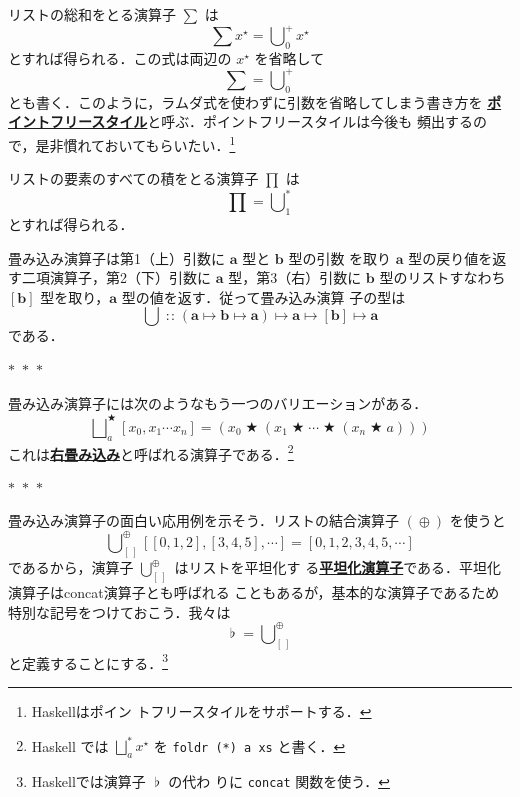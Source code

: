 \documentclass[a5paper,twoside,fleqn,draft]{jsbook}
\newcommand{\separator}{\begin{center}$*$~$*$~$*$\end{center}}
\newcommand{\programminglanguage}[1]{\textsf{#1}}
\newcommand{\haskell}{\programminglanguage{Haskell}}
\newcommand{\keyword}[1]{{\underline{\textbf{#1}}}}
\newcommand{\code}[1]{\texttt{#1}}
\newcommand{\mEmptyList}{{[\,]}}
\DeclareMathOperator{\mAppend}{\oplus}
\DeclareMathOperator{\mBinOp}{\bigstar}
\DeclareMathOperator{\mConcat}{\flat}
\DeclareMathOperator*{\mFold}{\bigcup}
\DeclareMathOperator*{\mFoldRight}{\bigsqcup}
\DeclareMathOperator{\mIn}{{:\!:}}
\DeclareMathOperator{\mMapsTo}{\mapsto}
\newcommand{\mType}[1]{\mathbf{#1}}
\newcommand{\mListType}[1]{[\mType{#1}]}
\newcommand{\mListWith}[1]{\left[#1\right]}
\newcommand{\mList}[1]{{#1}^\mathrm{\star}}
\newcommand{\mProj}[2]{#1\mMapsTo#2}
\begin{document}
リストの総和をとる演算子 $\sum$ は
\begin{equation}
\sum\mList{x}=\mFold^+_0\mList{x}
\end{equation}
とすれば得られる．この式は両辺の $\mList{x}$ を省略して
\begin{equation}
\sum=\mFold^+_0
\end{equation}
とも書く．このように，ラムダ式を使わずに引数を省略してしまう書き方を
\keyword{ポイントフリースタイル}と呼ぶ．ポイントフリースタイルは今後も
頻出するので，是非慣れておいてもらいたい．\footnote{\haskell はポイン
  トフリースタイルをサポートする．}

リストの要素のすべての積をとる演算子 $\prod$ は
\begin{equation}
\prod=\mFold^*_1
\end{equation}
とすれば得られる．

畳み込み演算子は第1（上）引数に $\mType{a}$ 型と $\mType{b}$ 型の引数
を取り $\mType{a}$ 型の戻り値を返す二項演算子，第2（下）引数に
$\mType{a}$ 型，第3（右）引数に $\mType{b}$ 型のリストすなわち
$\mListType{b}$ 型を取り，$\mType{a}$ 型の値を返す．従って畳み込み演算
子の型は
\begin{equation}
\mFold \mIn{} \mProj{
  (\mProj{\mType{a}}{\mProj{\mType{b}}{\mType{a}}}) } {
  \mProj{\mType{a}}{\mProj{\mListType{b}}{\mType{a}}} }
\end{equation}
である．

\separator

畳み込み演算子には次のようなもう一つのバリエーションがある．
\begin{equation}
\mFoldRight^{\mBinOp}_{a}\mListWith{x_0,x_1\dotsb x_n}
=(x_0\mBinOp(x_1\mBinOp\dotsb\mBinOp(x_n\mBinOp a)))
\end{equation}
これは\keyword{右畳み込み}と呼ばれる演算子である．\footnote{\haskell
  では $\mFoldRight^{*}_a\mList{x}$ を \code{foldr (*) a xs} と書く．}

\separator

畳み込み演算子の面白い応用例を示そう．リストの結合演算子 $(\mAppend)$
を使うと
\begin{equation}
  \mFold_\mEmptyList^{\mAppend}\mListWith{\mListWith{0,1,2},\mListWith{3,4,5},\dotsb}
  =\mListWith{0,1,2,3,4,5,\dotsb}
\end{equation}
であるから，演算子 $\mFold_\mEmptyList^{\mAppend}$ はリストを平坦化す
る\keyword{平坦化演算子}である．平坦化演算子はconcat演算子とも呼ばれる
こともあるが，基本的な演算子であるため特別な記号をつけておこう．我々は
\begin{equation}
\mConcat=\mFold_\mEmptyList^{\mAppend}
\end{equation}
と定義することにする．\footnote{\haskell では演算子 $\mConcat$ の代わ
  りに \code{concat} 関数を使う．}
\end{document}
